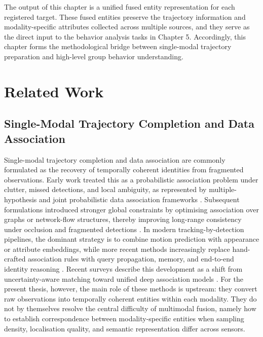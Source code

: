 The output of this chapter is a unified fused entity representation for each registered target. These fused entities preserve the trajectory information and modality-specific attributes collected across multiple sources, and they serve as the direct input to the behavior analysis tasks in Chapter 5. Accordingly, this chapter forms the methodological bridge between single-modal trajectory preparation and high-level group behavior understanding.

\section{Related Work}

\subsection{Single-Modal Trajectory Completion and Data Association}
Single-modal trajectory completion and data association are commonly formulated as the recovery of temporally coherent identities from fragmented observations. Early work treated this as a probabilistic association problem under clutter, missed detections, and local ambiguity, as represented by multiple-hypothesis and joint probabilistic data association frameworks \cite{reid1979mht,fortmann1983jpda}. Subsequent formulations introduced stronger global constraints by optimising association over graphs or network-flow structures, thereby improving long-range consistency under occlusion and fragmented detections \cite{schulter2017deepnetworkflow,dendorfer2021motchallenge}. In modern tracking-by-detection pipelines, the dominant strategy is to combine motion prediction with appearance or attribute embeddings, while more recent methods increasingly replace hand-crafted association rules with query propagation, memory, and end-to-end identity reasoning \cite{bewley2016sort,wojke2017deepsort,zhang2022bytetrack,aharon2022botsort,sun2021transtrack,meinhardt2022trackformer,zeng2022motr,gao2023memotr,gao2025motip}. Recent surveys describe this development as a shift from uncertainty-aware matching toward unified deep association models \cite{adzemovic2025motsurvey}. For the present thesis, however, the main role of these methods is upstream: they convert raw observations into temporally coherent entities within each modality. They do not by themselves resolve the central difficulty of multimodal fusion, namely how to establish correspondence between modality-specific entities when sampling density, localisation quality, and semantic representation differ across sensors.

